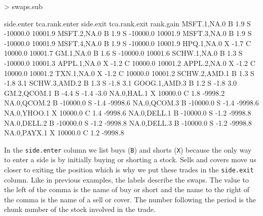 \documentclass{article}
\begin{document}
\begin{Schunk}
\begin{Sinput}
> swaps.sub
\end{Sinput}
\begin{Soutput}
             side.enter tca.rank.enter side.exit tca.rank.exit rank.gain
MSFT.1,NA.0           B            1.9         S      -10000.0   10001.9
MSFT.2,NA.0           B            1.9         S      -10000.0   10001.9
MSFT.3,NA.0           B            1.9         S      -10000.0   10001.9
MSFT.4,NA.0           B            1.9         S      -10000.0   10001.9
HPQ.1,NA.0            X           -1.7         C       10000.0   10001.7
GM.1,NA.0             B            1.6         S      -10000.0   10001.6
SCHW.1,NA.0           B            1.3         S      -10000.0   10001.3
APPL.1,NA.0           X           -1.2         C       10000.0   10001.2
APPL.2,NA.0           X           -1.2         C       10000.0   10001.2
TXN.1,NA.0            X           -1.2         C       10000.0   10001.2
SCHW.2,AMD.1          B            1.3         S          -1.8       3.1
SCHW.3,AMD.2          B            1.3         S          -1.8       3.1
GOOG.1,AMD.3          B            1.2         S          -1.8       3.0
GM.2,QCOM.1           B           -4.4         S          -1.4      -3.0
NA.0,HAL.1            X        10000.0         C           1.8   -9998.2
NA.0,QCOM.2           B       -10000.0         S          -1.4   -9998.6
NA.0,QCOM.3           B       -10000.0         S          -1.4   -9998.6
NA.0,YHOO.1           X        10000.0         C           1.4   -9998.6
NA.0,DELL.1           B       -10000.0         S          -1.2   -9998.8
NA.0,DELL.2           B       -10000.0         S          -1.2   -9998.8
NA.0,DELL.3           B       -10000.0         S          -1.2   -9998.8
NA.0,PAYX.1           X        10000.0         C           1.2   -9998.8
\end{Soutput}
\end{Schunk}

In the \texttt{side.enter} column we list buys (\texttt{B}) and shorts
(\texttt{X}) because the only way to enter a side is by initially
buying or shorting a stock.  Sells and covers move us closer to
exiting the position which is why we put these trades in the
\texttt{side.exit} column.  Like in previous examples, the labels
describe the swaps.  The value to the left of the comma is the name of
buy or short and the name to the right of the comma is the name of a
sell or cover.  The number following the period is the chunk number of
the stock involved in the trade.
\end{document}
